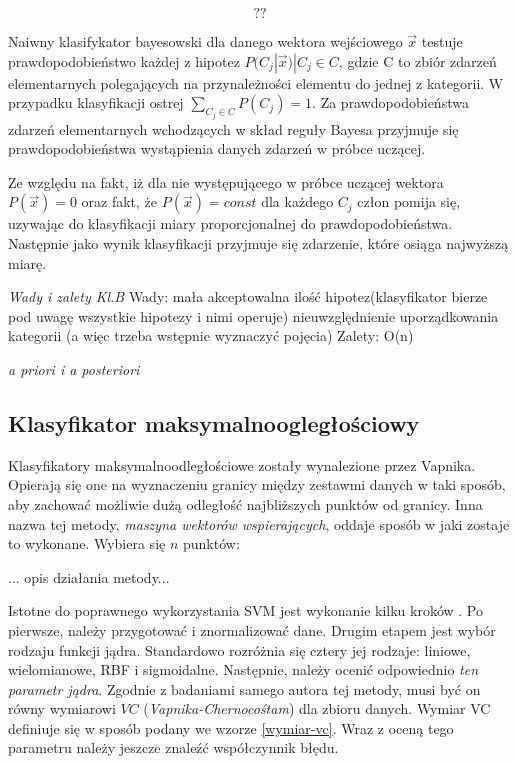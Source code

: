 \documentclass[12pt,a4paper,oneside]{report} %
\begin{document}
\begin{equation}
??
\end{equation}
\label{niezaleznosc}

Naiwny klasifykator bayesowski dla danego wektora wejściowego $\vec{x}$ testuje prawdopodobieństwo każdej z hipotez $P(C_j|\vec{x}) | C_j \in C$, gdzie C to zbiór zdarzeń elementarnych polegających na przynależności elementu do jednej z kategorii. W przypadku klasyfikacji ostrej $\sum_{C_j \in C} P(C_j) = 1 $. Za prawdopodobieństwa zdarzeń elementarnych wchodzących w skład reguły Bayesa przyjmuje się prawdopodobieństwa wystąpienia danych zdarzeń w próbce uczącej. \par

Ze względu na fakt, iż dla nie występującego w próbce uczącej wektora $P(\vec{x}) = 0$ oraz fakt, że $P(\vec{x})=const$ dla każdego $C_j$ człon pomija się, uzywając do klasyfikacji miary proporcjonalnej do prawdopodobieństwa. Następnie jako wynik klasyfikacji przyjmuje się zdarzenie, które osiąga najwyższą miarę.\par

\emph{Wady i zalety Kl.B}
Wady:
mała akceptowalna ilość hipotez(klasyfikator bierze pod uwagę wszystkie hipotezy i nimi operuje)
nieuwzględnienie uporządkowania kategorii (a więc trzeba wstępnie wyznaczyć pojęcia)
Zalety:
O(n)

\emph{a priori i a posteriori}

\subsection{Klasyfikator maksymalnoogległościowy}

Klasyfikatory maksymalnoodległościowe zostały wynalezione przez Vapnika. Opierają się one na wyznaczeniu granicy między zestawmi danych w taki sposób, aby zachować możliwie dużą odległość najbliższych punktów od granicy. Inna nazwa tej metody, \emph{maszyna wektorów wspierających}, oddaje sposób w jaki zostaje to wykonane. Wybiera się $n$ punktów:\par
... opis działania metody...\par
Istotne do poprawnego wykorzystania SVM jest wykonanie kilku kroków \cite{chih-wei}. Po pierwsze, należy przygotować i znormalizować dane. Drugim etapem jest wybór rodzaju funkcji jądra. Standardowo rozróżnia się cztery jej rodzaje: liniowe, wielomianowe, RBF i sigmoidalne. Następnie, należy ocenić odpowiednio \emph{ten parametr jądra}. Zgodnie z badaniami samego autora tej metody, musi być on równy wymiarowi $VC$ (\emph{Vapnika-Chernocośtam}) dla zbioru danych. Wymiar VC definiuje się w sposób podany we wzorze \ref{wymiar-vc}. Wraz z oceną tego parametru należy jeszcze znaleźć współczynnik błędu. \par
\end{document}
